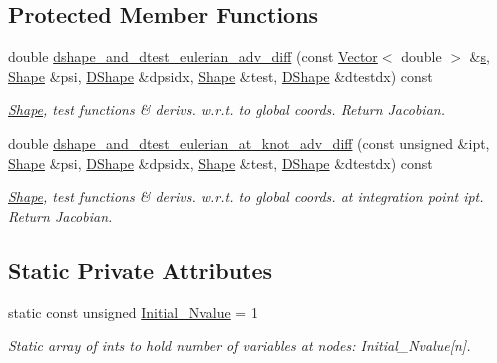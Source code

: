 \subsection*{Protected Member Functions}
\begin{DoxyCompactItemize}
\item 
double \hyperlink{classoomph_1_1QSteadyAxisymAdvectionDiffusionElement_a489c77885741e624d87abe60a82483f3}{dshape\+\_\+and\+\_\+dtest\+\_\+eulerian\+\_\+adv\+\_\+diff} (const \hyperlink{classoomph_1_1Vector}{Vector}$<$ double $>$ \&\hyperlink{cfortran_8h_ab7123126e4885ef647dd9c6e3807a21c}{s}, \hyperlink{classoomph_1_1Shape}{Shape} \&psi, \hyperlink{classoomph_1_1DShape}{D\+Shape} \&dpsidx, \hyperlink{classoomph_1_1Shape}{Shape} \&test, \hyperlink{classoomph_1_1DShape}{D\+Shape} \&dtestdx) const
\begin{DoxyCompactList}\small\item\em \hyperlink{classoomph_1_1Shape}{Shape}, test functions \& derivs. w.\+r.\+t. to global coords. Return Jacobian. \end{DoxyCompactList}\item 
double \hyperlink{classoomph_1_1QSteadyAxisymAdvectionDiffusionElement_aa4c9a7d6ebe2fcc8400d3309d508e2a9}{dshape\+\_\+and\+\_\+dtest\+\_\+eulerian\+\_\+at\+\_\+knot\+\_\+adv\+\_\+diff} (const unsigned \&ipt, \hyperlink{classoomph_1_1Shape}{Shape} \&psi, \hyperlink{classoomph_1_1DShape}{D\+Shape} \&dpsidx, \hyperlink{classoomph_1_1Shape}{Shape} \&test, \hyperlink{classoomph_1_1DShape}{D\+Shape} \&dtestdx) const
\begin{DoxyCompactList}\small\item\em \hyperlink{classoomph_1_1Shape}{Shape}, test functions \& derivs. w.\+r.\+t. to global coords. at integration point ipt. Return Jacobian. \end{DoxyCompactList}\end{DoxyCompactItemize}
\subsection*{Static Private Attributes}
\begin{DoxyCompactItemize}
\item 
static const unsigned \hyperlink{classoomph_1_1QSteadyAxisymAdvectionDiffusionElement_ab351f94c3f0203cf8102f02e0e882276}{Initial\+\_\+\+Nvalue} = 1
\begin{DoxyCompactList}\small\item\em Static array of ints to hold number of variables at nodes\+: Initial\+\_\+\+Nvalue\mbox{[}n\mbox{]}. \end{DoxyCompactList}\end{DoxyCompactItemize}
